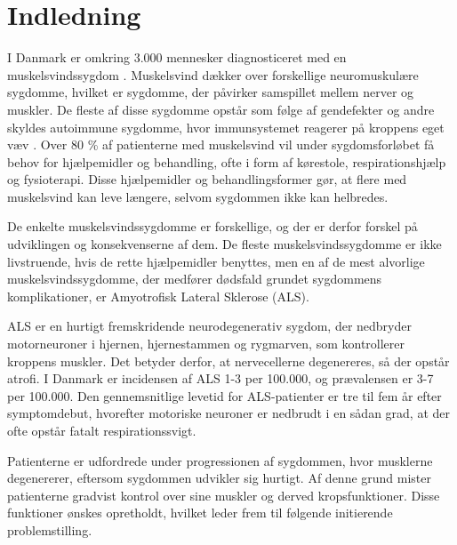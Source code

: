 \section{Indledning}



I Danmark er omkring 3.000 mennesker diagnosticeret med en muskelsvindssygdom \citep{universitet2013}. Muskelsvind dækker over forskellige neuromuskulære sygdomme, hvilket er sygdomme, der påvirker samspillet mellem nerver og muskler. De fleste af disse sygdomme opstår som følge af gendefekter og andre skyldes autoimmune sygdomme, hvor immunsystemet reagerer på kroppens eget væv \citep{arathata2014}. Over 80 \% af patienterne med muskelsvind vil under sygdomsforløbet få behov for hjælpemidler og behandling, ofte i form af kørestole, respirationshjælp og fysioterapi. Disse hjælpemidler og behandlingsformer gør, at flere med muskelsvind kan leve længere, selvom sygdommen ikke kan helbredes. 

De enkelte muskelsvindssygdomme er forskellige, og der er derfor forskel på udviklingen og konsekvenserne af dem. De fleste muskelsvindssygdomme er ikke livstruende, hvis de rette hjælpemidler benyttes, men en af de mest alvorlige muskelsvindssygdomme, der medfører dødsfald grundet sygdommens komplikationer, er Amyotrofisk Lateral Sklerose (ALS).  \citep{hvadermuskelsvind2016}

ALS er en hurtigt fremskridende neurodegenerativ sygdom, der nedbryder motorneuroner i hjernen, hjernestammen og rygmarven, som kontrollerer kroppens muskler. Det betyder derfor, at nervecellerne degenereres, så der opstår atrofi. I Danmark er incidensen af ALS 1-3 per 100.000, og prævalensen er 3-7 per 100.000. Den gennemsnitlige levetid for ALS-patienter er tre til fem år efter symptomdebut, hvorefter motoriske neuroner er nedbrudt i en sådan grad, at der ofte opstår fatalt respirationssvigt. \citep{russell2015, morris2015}

Patienterne er udfordrede under progressionen af sygdommen, hvor musklerne degenererer, eftersom sygdommen udvikler sig hurtigt. Af denne grund mister patienterne gradvist kontrol over sine muskler og derved kropsfunktioner. Disse funktioner ønskes opretholdt, hvilket leder frem til følgende initierende problemstilling. 
 
